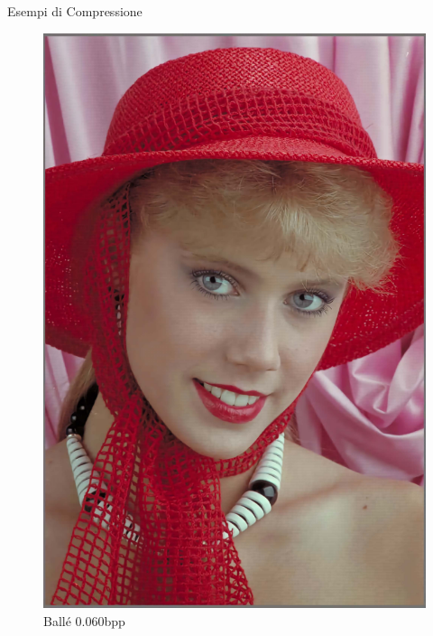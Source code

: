 \begin{frame}{Esempi di Compressione}
\begin{figure}[!ht]
\begin{minipage}[]{0.13\linewidth}
                \includegraphics[width=\textwidth]{Immagini/IMAGES/mbt2018_2_IMG0004.pdf}
                \caption{Ballé 0.060bpp}
                \label{fig:ExampleBalle}
            \end{minipage}
            \begin{minipage}[]{0.13\linewidth}
                \centering

\end{minipage}
\end{figure}
\end{frame}
